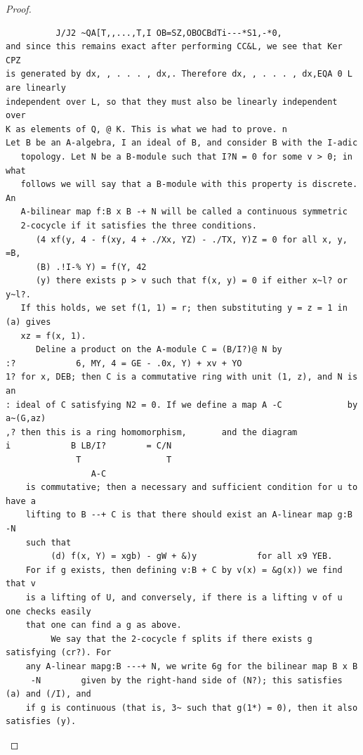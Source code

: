 \begin{proof}
\begin{verbatim}
          J/J2 ~QA[T,,...,T,I OB=SZ,OBOCBdTi---*S1,-*0,
and since this remains exact after performing CC&L, we see that Ker CPZ
is generated by dx, , . . . , dx,. Therefore dx, , . . . , dx,EQA 0 L are linearly
independent over L, so that they must also be linearly independent over
K as elements of Q, @ K. This is what we had to prove. n
Let B be an A-algebra, I an ideal of B, and consider B with the I-adic
   topology. Let N be a B-module such that I?N = 0 for some v > 0; in what
   follows we will say that a B-module with this property is discrete. An
   A-bilinear map f:B x B -+ N will be called a continuous symmetric
   2-cocycle if it satisfies the three conditions.
      (4 xf(y, 4 - f(xy, 4 + ./Xx, YZ) - ./TX, Y)Z = 0 for all x, y, =B,
      (B) .!I-% Y) = f(Y, 42
      (y) there exists p > v such that f(x, y) = 0 if either x~l? or y~l?.
   If this holds, we set f(1, 1) = r; then substituting y = z = 1 in (a) gives
   xz = f(x, 1).
      Deline a product on the A-module C = (B/I?)@ N by
:?            6, MY, 4 = GE - .0x, Y) + xv + YO
1? for x, DEB; then C is a commutative ring with unit (1, z), and N is an
: ideal of C satisfying N2 = 0. If we define a map A -C             by a~(G,az)
,? then this is a ring homomorphism,       and the diagram
i            B LB/I?        = C/N
              T                 T
                 A-C
    is commutative; then a necessary and sufficient condition for u to have a
    lifting to B --+ C is that there should exist an A-linear map g:B -N
    such that
         (d) f(x, Y) = xgb) - gW + &)y            for all x9 YEB.
    For if g exists, then defining v:B + C by v(x) = &g(x)) we find that v
    is a lifting of U, and conversely, if there is a lifting v of u one checks easily
    that one can find a g as above.
         We say that the 2-cocycle f splits if there exists g satisfying (cr?). For
    any A-linear mapg:B ---+ N, we write 6g for the bilinear map B x B
     -N        given by the right-hand side of (N?); this satisfies (a) and (/I), and
    if g is continuous (that is, 3~ such that g(1*) = 0), then it also satisfies (y).
\end{verbatim}
\end{proof}


